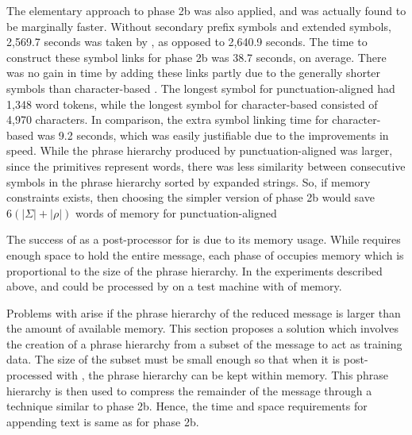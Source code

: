 The elementary approach to phase 2b
was also applied, and was actually found to be marginally faster.  Without 
secondary prefix symbols and extended symbols, 2,569.7 seconds 
was taken by \remerge, as opposed to 2,640.9 seconds.  The time to 
construct these symbol links for phase 2b was 38.7 seconds, 
on average.
There was no gain in time by adding these links partly due to the generally
shorter symbols than character-based \repair.  The longest symbol for
punctuation-aligned \repair had 1,348 word tokens, while the longest
symbol for character-based \repair consisted of 4,970 
characters.  In comparison,
the extra symbol linking time for character-based 
\repair was 9.2 seconds, which was easily justifiable
due to the improvements in speed.  While the
phrase hierarchy produced by punctuation-aligned \repair was larger,
since the primitives represent words, there was less similarity between
consecutive symbols in the phrase hierarchy sorted by expanded strings.
So, if memory constraints exists,
then choosing the simpler version of phase 2b would save 
$6 (|\Sigma| + |\rho|)$ words of memory for punctuation-aligned
\repair


The success of \remerge as a post-processor for \repair is due to
its memory usage.  While \repair requires enough space to hold the
entire message, each phase of \remerge occupies memory which is
proportional to the size of the phrase hierarchy.
In the experiments described above, \wsjb and \news
could be processed by \remerge on a test machine with  
of memory.  

Problems with \remerge arise if the phrase hierarchy of the
reduced message is larger than the amount of available memory.  
This section proposes a solution which involves the creation
of a phrase hierarchy from a subset of the message to act as training
data.  The size of the subset must be small enough so
that when it is post-processed with \remerge, the phrase hierarchy
can be kept within memory.  This phrase hierarchy
is then used to compress the remainder of the message through a technique
similar to phase 2b.  Hence, the time and space requirements for
appending text is same as for phase 2b.

